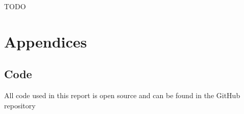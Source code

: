 \documentclass{article}
\theoremstyle{definition}
\numberwithin{equation}{section}
\begin{document}
TODO

\newpage




\newpage

\appendix
\section*{Appendices}
\renewcommand{\thesubsection}{\Alph{subsection}}

\subsection{Code}
\label{sec:code}

All code used in this report is open source and can be found in the GitHub repository \cite{github}

\printglossary[type=\acronymtype]

\printglossary
\end{document}
